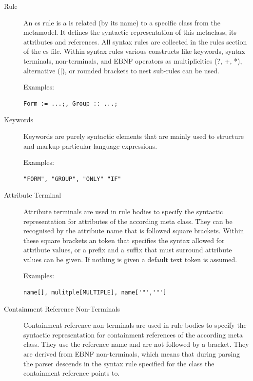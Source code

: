 	\begin{description}
       \item[Rule] An cs rule is a is related (by its name) to a specific
		class from the metamodel. It defines the syntactic representation of this
		metaclass, its attributes and references. All syntax rules are collected in
		the rules section of the cs file. Within syntax rules various constructs like
		keywords, syntax terminals, non-terminals, and EBNF operators as
		multiplicities (?, +, *), alternative (|), or rounded brackets 
		to nest sub-rules can be used.
		
		Examples: \begin{verbatim}Form := ...;, Group :: ...;\end{verbatim}
        
       \item[Keywords] Keywords are purely syntactic elements that are mainly
        used to structure and markup particular language expressions.
        
        Examples: \begin{verbatim}"FORM", "GROUP", "ONLY" "IF" \end{verbatim}
        
        
       \item[Attribute Terminal] Attribute terminals are used in rule bodies to
        specify the syntactic representation for attributes of the according
        meta class. They can be recognised by the attribute name that is followed
        square brackets. Within these square brackets an token that specifies
        the syntax allowed for attribute values, or a prefix and a suffix that
        must surround attribute values can be given. If nothing is given a
        default text token is assumed.

        Examples: \begin{verbatim}name[], mulitple[MULTIPLE], name['"','"']\end{verbatim}


       \item[Containment Reference Non-Terminals] Containment reference non-terminals
       are used in rule bodies to specify the syntactic representation for
       containment references of the according meta class. They use the
       reference name and are not followed by a bracket. They are derived from
       EBNF non-terminals, which means that during parsing the parser descends
       in the syntax rule specified for the class the
       containment reference points to.


\end{description}

